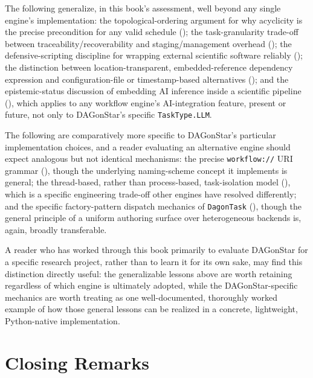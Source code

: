 The following generalize, in this book's assessment, well beyond any single
engine's implementation: the topological-ordering argument for why
acyclicity is the precise precondition for any valid schedule
(); the task-granularity trade-off between
traceability/recoverability and staging/management overhead
(); the defensive-scripting discipline for
wrapping external scientific software reliably
(); the distinction between location-transparent,
embedded-reference dependency expression and configuration-file or
timestamp-based alternatives (); and the
epistemic-status discussion of embedding AI inference inside a scientific
pipeline (), which applies to any workflow engine's
AI-integration feature, present or future, not only to DAGonStar's specific
\texttt{TaskType.LLM}.

The following are comparatively more specific to DAGonStar's particular
implementation choices, and a reader evaluating an alternative engine should
expect analogous but not identical mechanisms: the precise
\texttt{workflow://} URI grammar (), though the underlying
naming-scheme concept it implements is general; the thread-based, rather
than process-based, task-isolation model (),
which is a specific engineering trade-off other engines have resolved
differently; and the specific factory-pattern dispatch mechanics of
\texttt{DagonTask} (), though the general
principle of a uniform authoring surface over heterogeneous backends is, again,
broadly transferable.

\begin{practicebox}
A reader who has worked through this book primarily to evaluate DAGonStar
for a specific research project, rather than to learn it for its own sake,
may find this distinction directly useful: the generalizable lessons above
are worth retaining regardless of which engine is ultimately adopted, while
the DAGonStar-specific mechanics are worth treating as one well-documented,
thoroughly worked example of how those general lessons can be realized in a
concrete, lightweight, Python-native implementation.
\end{practicebox}

\section{Closing Remarks}

